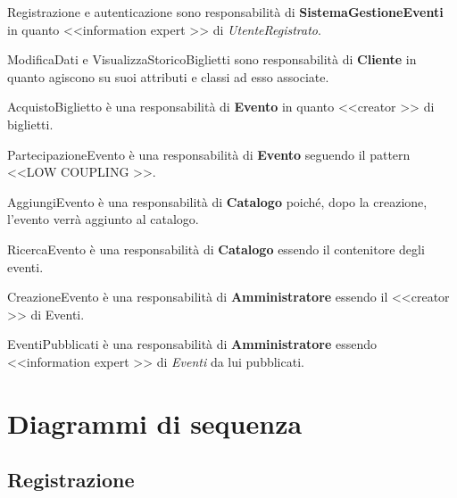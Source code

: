 \begin{description}
	\item Registrazione e autenticazione sono responsabilità di \textbf{SistemaGestioneEventi} in quanto \textless\textless information expert \textgreater\textgreater{} di \textit{UtenteRegistrato}.
	
	\item ModificaDati e VisualizzaStoricoBiglietti sono responsabilità di \textbf{Cliente} in quanto agiscono su suoi attributi e classi ad esso associate.
	
	\item AcquistoBiglietto è una responsabilità di \textbf{Evento} in quanto \textless\textless creator \textgreater\textgreater{} di biglietti.
	
	\item PartecipazioneEvento è una responsabilità di \textbf{Evento} seguendo il pattern \textless\textless LOW COUPLING \textgreater\textgreater.
	
	\item AggiungiEvento è una responsabilità di \textbf{Catalogo} poiché, dopo la creazione, l’evento verrà aggiunto al catalogo.
	
	\item RicercaEvento è una responsabilità di \textbf{Catalogo} essendo il contenitore degli eventi.
	
	\item CreazioneEvento è una responsabilità di \textbf{Amministratore} essendo il \textless\textless creator \textgreater\textgreater{} di Eventi.
	
	\item EventiPubblicati è una responsabilità di \textbf{Amministratore} essendo \textless\textless information expert \textgreater\textgreater{} di \textit{Eventi} da lui pubblicati.
  \end{description}


\clearpage


\section{Diagrammi di sequenza}


\subsection{Registrazione}

